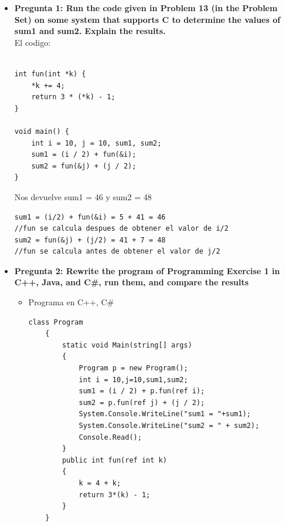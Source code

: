 \documentclass[12pt,oneside]{article}
\begin{document}
			\begin{itemize}
				\item {\bf Pregunta 1: Run the code given in Problem 13 (in the Problem Set) on some system that supports C to determine the values of sum1 and sum2. Explain the results.}
					\\El codigo:
					\lstset{language=C,basicstyle=\small\sffamily,numbers=left,numberstyle=\tiny,frame=tb,columns=fullflexible,showstringspaces=false}
					\begin{lstlisting}[frame=single]  % Start your code-block

int fun(int *k) {
	*k += 4;
	return 3 * (*k) - 1;
}

void main() {
	int i = 10, j = 10, sum1, sum2;
	sum1 = (i / 2) + fun(&i);
	sum2 = fun(&j) + (j / 2);
}
					\end{lstlisting}
					Nos devuelve sum1 = 46 y sum2 = 48
\begin{lstlisting}[frame=single]
sum1 = (i/2) + fun(&i) = 5 + 41 = 46  
//fun se calcula despues de obtener el valor de i/2
sum2 = fun(&j) + (j/2) = 41 + 7 = 48  
//fun se calcula antes de obtener el valor de j/2
\end{lstlisting}
					
				\item {\bf Pregunta 2: Rewrite the program of Programming Exercise 1 in C++, Java, and C\#, run them, and compare the results}
					\begin{itemize}
						\item {Programa en C++, C\#}
							\begin{lstlisting}[frame = single] 
class Program
    {
        static void Main(string[] args)
        {
            Program p = new Program();
            int i = 10,j=10,sum1,sum2;
            sum1 = (i / 2) + p.fun(ref i);
            sum2 = p.fun(ref j) + (j / 2);
            System.Console.WriteLine("sum1 = "+sum1);
            System.Console.WriteLine("sum2 = " + sum2);
            Console.Read();
        }
        public int fun(ref int k)
        {
            k = 4 + k;
            return 3*(k) - 1;
        }
    }


\end{lstlisting}
\end{itemize}
\end{itemize}
\end{document}
